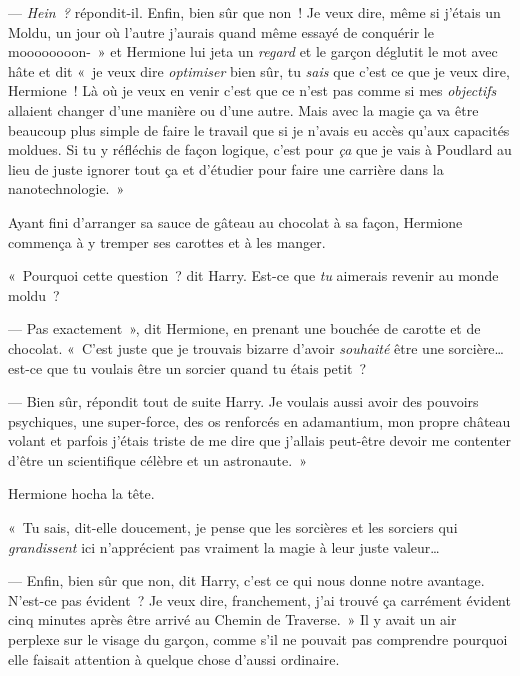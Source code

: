 --- \emph{Hein~?} répondit-il. Enfin, bien sûr que non~! Je veux dire, même si j'étais un Moldu, un jour où l'autre j'aurais quand même essayé de conquérir le moooooooon-~» et Hermione lui jeta un \emph{regard} et le garçon déglutit le mot avec hâte et dit «~je veux dire \emph{optimiser} bien sûr, tu \emph{sais} que c'est ce que je veux dire, Hermione~! Là où je veux en venir c'est que ce n'est pas comme si mes \emph{objectifs} allaient changer d'une manière ou d'une autre. Mais avec la magie ça va être beaucoup plus simple de faire le travail que si je n'avais eu accès qu'aux capacités moldues. Si tu y réfléchis de façon logique, c'est pour \emph{ça} que je vais à Poudlard au lieu de juste ignorer tout ça et d'étudier pour faire une carrière dans la nanotechnologie.~»

Ayant fini d'arranger sa sauce de gâteau au chocolat à sa façon, Hermione commença à y tremper ses carottes et à les manger.

«~Pourquoi cette question~? dit Harry. Est-ce que \emph{tu} aimerais revenir au monde moldu~?

--- Pas exactement~», dit Hermione, en prenant une bouchée de carotte et de chocolat. «~C'est juste que je trouvais bizarre d'avoir \emph{souhaité} être une sorcière… est-ce que tu voulais être un sorcier quand tu étais petit~?

--- Bien sûr, répondit tout de suite Harry. Je voulais aussi avoir des pouvoirs psychiques, une super-force, des os renforcés en adamantium, mon propre château volant et parfois j'étais triste de me dire que j'allais peut-être devoir me contenter d'être un scientifique célèbre et un astronaute.~»

Hermione hocha la tête.

«~Tu sais, dit-elle doucement, je pense que les sorcières et les sorciers qui \emph{grandissent} ici n'apprécient pas vraiment la magie à leur juste valeur…

--- Enfin, bien sûr que non, dit Harry, c'est ce qui nous donne notre avantage. N'est-ce pas évident~? Je veux dire, franchement, j'ai trouvé ça carrément évident cinq minutes après être arrivé au Chemin de Traverse.~» Il y avait un air perplexe sur le visage du garçon, comme s'il ne pouvait pas comprendre pourquoi elle faisait attention à quelque chose d'aussi ordinaire.
